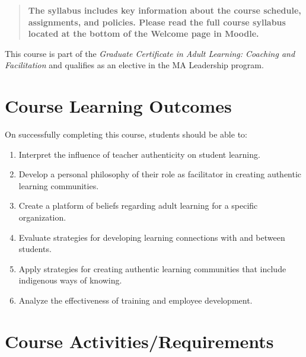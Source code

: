 \documentclass[
]{book}
\providecommand{\tightlist}{%
  \setlength{\itemsep}{0pt}\setlength{\parskip}{0pt}}
\begin{document}
\begin{quote}
\textbf{The syllabus includes key information about the course schedule, assignments, and policies. Please read the full course syllabus located at the bottom of the Welcome page in Moodle.}
\end{quote}

This course is part of the \emph{Graduate Certificate in Adult Learning: Coaching and Facilitation} and qualifies as an elective in the MA Leadership program.

\hypertarget{course-learning-outcomes}{%
\section*{Course Learning Outcomes}\label{course-learning-outcomes}}

On successfully completing this course, students should be able to:

\begin{enumerate}
\def\labelenumi{\arabic{enumi}.}
\tightlist
\item
  Interpret the influence of teacher authenticity on student learning.\\
\item
  Develop a personal philosophy of their role as facilitator in creating authentic learning communities.\\
\item
  Create a platform of beliefs regarding adult learning for a specific organization.\\
\item
  Evaluate strategies for developing learning connections with and between students.\\
\item
  Apply strategies for creating authentic learning communities that include indigenous ways of knowing.\\
\item
  Analyze the effectiveness of training and employee development.
\end{enumerate}

\hypertarget{course-activitiesrequirements}{%
\section*{Course Activities/Requirements}\label{course-activitiesrequirements}}
\end{document}
